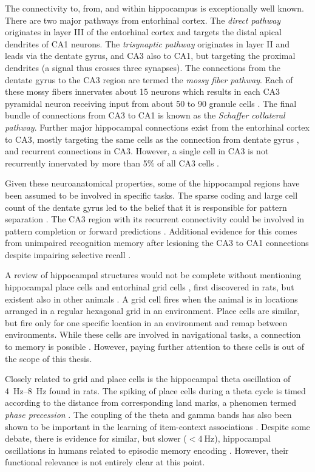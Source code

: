 The connectivity to, from, and within hippocampus is exceptionally well known.
There are two major pathways from entorhinal cortex.
The \emph{direct pathway} originates in layer III of the entorhinal cortex and targets the distal apical dendrites of CA1 neurons.
The \emph{trisynaptic pathway} originates in layer II and leads via the dentate gyrus, and CA3 also to CA1, but targeting the proximal dendrites (a signal thus crosses three synapses).
The connections from the dentate gyrus to the CA3 region are termed the \emph{mossy fiber pathway}.
Each of these mossy fibers innervates about 15 neurons \parencite{Claiborne1986} which results in each CA3 pyramidal neuron receiving input from about 50 to 90 granule cells \parencite[230]{Squire1989}.
The final bundle of connections from CA3 to CA1 is known as the \emph{Schaffer collateral pathway}.
Further major hippocampal connections exist from the entorhinal cortex to CA3, mostly targeting the same cells as the connection from dentate gyrus \parencite{Paxinos2014}, and recurrent connections in CA3.
However, a single cell in CA3 is not recurrently innervated by more than 5\% of all CA3 cells \parencite[231]{Squire1989}.

Given these neuroanatomical properties, some of the hippocampal regions have been assumed to be involved in specific tasks.
The sparse coding and large cell count of the dentate gyrus led to the belief that it is responsible for pattern separation \parencite{Rolls2013}.
The CA3 region with its recurrent connectivity could be involved in pattern completion or forward predictions \parencite{Guzowski2004,Leutgeb2007,Rolls2013}.
Additional evidence for this comes from unimpaired recognition memory after lesioning the CA3 to CA1 connections despite impairing selective recall \parencite{Brun2002}. 

A review of hippocampal structures would not be complete without mentioning hippocampal place cells and entorhinal grid cells \parencite{hafting2005}, first discovered in rats, but existent also in other animals \parencite{buzsaki2013}.
A grid cell fires when the animal is in locations arranged in a regular hexagonal grid in an environment.
Place cells are similar, but fire only for one specific location in an environment and remap between environments.
While these cells are involved in navigational tasks, a connection to memory is possible \parencite{buzsaki2013}.
However, paying further attention to these cells is out of the scope of this thesis.

Closely related to grid and place cells is the hippocampal theta oscillation of \SIrange{4}{8}{\hertz} found in rats.
The spiking of place cells during a theta cycle is timed according to the distance from corresponding land marks, a phenomen termed \emph{phase precession} \parencite{okeefe1993}.
The coupling of the theta and gamma bands has also been shown to be important in the learning of item-context associations \parencite{tort2009}.
Despite some debate, there is evidence for similar, but slower ($<\SI{4}{\hertz}$), hippocampal oscillations in humans related to episodic memory encoding \parencite{lega2012}.
However, their functional relevance is not entirely clear at this point.


